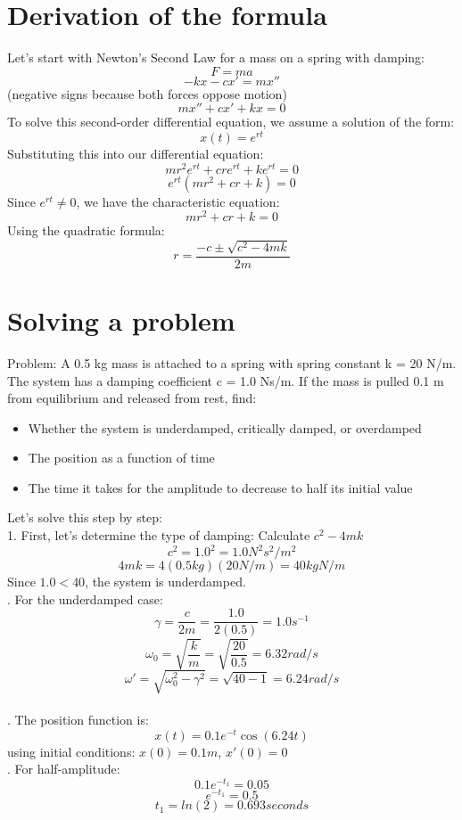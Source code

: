 \documentclass{article}
\begin{document}
\section{Derivation of the formula}
Let's start with Newton's Second Law for a mass on a spring with damping:
\[F = ma\]
\[-kx - cx' = mx''\]  (negative signs because both forces oppose motion)
\[mx'' + cx' + kx = 0\]
To solve this second-order differential equation, we assume a solution of the form:
\[x(t) = e^{rt}\]
Substituting this into our differential equation:
\[mr^2e^{rt} + cre^{rt} + ke^{rt} = 0\]
\[e^{rt}(mr^2 + cr + k) = 0\]
Since $e^{rt} \neq 0$, we have the characteristic equation:
\[mr^2 + cr + k = 0\]
Using the quadratic formula:
\[r = \frac{-c \pm \sqrt{c^2 - 4mk}}{2m}\]

\section{Solving a problem}
Problem: A 0.5 kg mass is attached to a spring with spring constant k = 20 N/m. The system has a damping coefficient c = 1.0 Ns/m. If the mass is pulled 0.1 m from equilibrium and released from rest, find:
\begin{itemize}
    \item Whether the system is underdamped, critically damped, or overdamped
    \item The position as a function of time
    \item The time it takes for the amplitude to decrease to half its initial value
\end{itemize}
Let's solve this step by step:\\
1. First, let's determine the type of damping:
Calculate $c^2 - 4mk$
\[c^2 = 1.0^2 = 1.0 N^2s^2/m^2\]
\[4mk = 4(0.5 kg)(20 N/m) = 40 kgN/m\]
Since $1.0 < 40$, the system is underdamped.\\

. For the underdamped case:
\[\gamma = \frac{c}{2m} = \frac{1.0}{2(0.5)} = 1.0 s^{-1}\]
\[\omega_0 = \sqrt{\frac{k}{m}} = \sqrt{\frac{20}{0.5}} = 6.32 rad/s\]
\[\omega ' = \sqrt{\omega_0^2 - \gamma^2} = \sqrt{40 - 1} = 6.24 rad/s\]\\

. The position function is:
\[x(t) = 0.1e^{-t}\cos(6.24t)\]
using initial conditions: $x(0) = 0.1 m$, $x'(0) = 0$\\

. For half-amplitude:
\[0.1e^{-t_1} = 0.05\]
\[e^{-t_1} = 0.5\]
\[t_1 = ln(2) = 0.693 seconds\]
\end{document}
